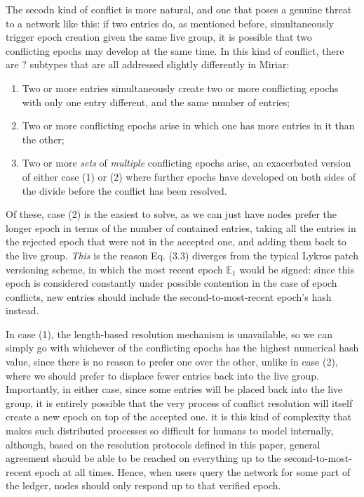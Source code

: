 \documentclass{extreport}
\begin{document}
The secodn kind of conflict is more natural, and one that poses a genuine threat to a network like this: if two entries do, as mentioned before, simultaneously trigger epoch creation given the same live group, it is possible that two conflicting epochs may develop at the same time. In this kind of conflict, there are ? subtypes that are all addressed slightly differently in Miriar:

\begin{enumerate}
\item Two or more entries simultaneously create two or more conflicting epochs with only one entry different, and the same number of entries;
\item Two or more conflicting epochs arise in which one has more entries in it than the other;
\item Two or more \emph{sets} of \emph{multiple} conflicting epochs arise, an exacerbated version of either case (1) or (2) where further epochs have developed on both sides of the divide before the conflict has been resolved.
\end{enumerate}

Of these, case (2) is the easiest to solve, as we can just have nodes prefer the longer epoch in terms of the number of contained entries, taking all the entries in the rejected epoch that were not in the accepted one, and adding them back to the live group. \emph{This} is the reason Eq. (3.3) diverges from the typical Lykros patch versioning scheme, in which the most recent epoch \(\mathbb{E}_1\) would be signed: since this epoch is considered constantly under possible contention in the case of epoch conflicts, new entries should include the second-to-most-recent epoch's hash instead.

In case (1), the length-based resolution mechanism is unavailable, so we can simply go with whichever of the conflicting epochs has the highest numerical hash value, since there is no reason to prefer one over the other, unlike in case (2), where we should prefer to displace fewer entries back into the live group. Importantly, in either case, since some entries will be placed back into the live group, it is entirely possible that the very process of conflict resolution will itself create a new epoch on top of the accepted one. it is this kind of complexity that makes such distributed processes so difficult for humans to model internally, although, based on the resolution protocols defined in this paper, general agreement should be able to be reached on everything up to the second-to-most-recent epoch at all times. Hence, when users query the network for some part of the ledger, nodes should only respond up to that verified epoch.
\end{document}
